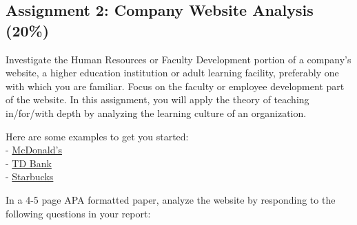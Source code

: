 \documentclass[
]{book}
\providecommand{\tightlist}{%
  \setlength{\itemsep}{0pt}\setlength{\parskip}{0pt}}
\begin{document}
\begin{assessment}
\hypertarget{assignment-2-company-website-analysis-20}{%
\subsection*{Assignment 2: Company Website Analysis
(20\%)}\label{assignment-2-company-website-analysis-20}}

Investigate the Human Resources or Faculty Development portion of a
company's website, a higher education institution or adult learning
facility, preferably one with which you are familiar. Focus on the
faculty or employee development part of the website. In this assignment,
you will apply the theory of teaching in/for/with depth by analyzing the
learning culture of an organization.

Here are some examples to get you started:\\
-
\href{https://www.mcdonalds.com/ca/en-ca/careers/training-and-benefits.html}{McDonald's}\\
-
\href{https://jobs.td.com/en-CA/why-choose-us/training-development/}{TD
Bank}\\
-
\href{https://www.starbucks.com.hk/about-us/become-a-partner/learning-and-development}{Starbucks}

In a 4-5 page APA formatted paper, analyze the website by responding to
the following questions in your report:



\end{assessment}
\end{document}
